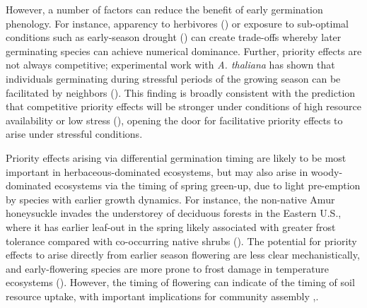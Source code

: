 \documentclass[11pt]{article}
\begin{document}
However, a number of factors can reduce the benefit of early germination phenology. For instance, apparency to herbivores (\citet{waterton2016trade}) or exposure to sub-optimal conditions such as early-season drought (\citet{wainwright2012seasonal})  can create trade-offs whereby later germinating species can achieve numerical dominance. Further, priority effects are not always competitive; experimental work with \textit{A. thaliana} has shown that individuals germinating during stressful periods of the growing season can be facilitated by neighbors (\citet{leverett2017germination}). This finding is broadly consistent with the prediction that competitive priority effects will be stronger under conditions of high resource availability or low stress (\citet{vannette2014historical}), opening the door for facilitative priority effects to arise under stressful conditions.

Priority effects arising via differential germination timing are likely to be most important in herbaceous-dominated ecosystems, but may also arise in woody-dominated ecosystems via the timing of spring green-up, due to light pre-emption by species with earlier growth dynamics. For instance, the non-native Amur honeysuckle invades the understorey of deciduous forests in the Eastern U.S., where it has earlier leaf-out in the spring likely associated with greater frost tolerance compared with co-occurring native shrubs (\citet{mcewan2009leaf}). The potential for priority effects to arise directly from earlier season flowering are less clear mechanistically, and early-flowering species are more prone to frost damage in temperature ecosystems (\citet{inouye2008effects}). However, the timing of flowering can indicate of the timing of soil resource uptake, with important implications for community assembly \citet{gulmon1983phenology},\citet{seabloom2003invasion}.
\end{document}
